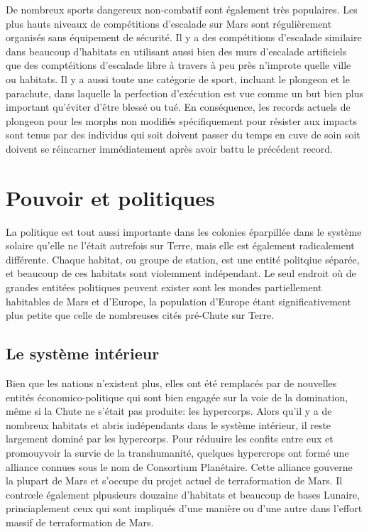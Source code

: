 De nombreux sports dangereux non-combatif sont également très populaires. Les plus hauts niveaux de compétitions d'escalade sur Mars sont régulièrement organisés sans équipement de sécurité. Il y a des compétitions d'escalade similaire dans beaucoup d'habitats en utilisant aussi bien des murs d'escalade artificiels que des comptéitions d'escalade libre à travers à peu près n'improte quelle ville ou habitats. Il y a aussi toute une catégorie de sport, incluant le plongeon et le parachute, dans laquelle la perfection d'exécution est vue comme un but bien plus important qu'éviter d'être blessé ou tué. En conséquence, les records actuels de plongeon pour les morphs non modifiés spécifiquement pour résister aux impacts sont tenus par des individus qui soit doivent passer du temps en cuve de soin soit doivent se réincarner immédiatement après avoir battu le précédent record. 

\section{Pouvoir et politiques} \label{sec:politics-power} 

La politique est tout aussi importante dans les colonies éparpillée dans le système solaire qu'elle ne l'était autrefois sur Terre, mais elle est également radicalement différente. Chaque habitat, ou groupe de station, est une entité politqiue séparée, et beaucoup de ces habitats sont violemment indépendant. Le seul endroit où de grandes entitées politiques peuvent exister sont les mondes partiellement habitables de Mars et d'Europe, la population d'Europe étant significativement plus petite que celle de nombreuses cités pré-Chute sur Terre. 

\subsection{Le système intérieur} \label{sec:inner-system} 

Bien que les nations n'existent plus, elles ont été remplacés par de nouvelles entités économico-politique qui sont bien engagée sur la voie de la domination, même si la Chute ne s'était pas produite: les hypercorps. Alors qu'il y a de nombreux habitats et abris indépendants dans le système intérieur, il reste largement dominé par les hypercorps. Pour réduuire les confits entre  eux et promouyvoir la survie de la transhumanité, quelques hypercrops ont formé une alliance connues sous le nom de Consortium Planétaire. Cette alliance gouverne la plupart de Mars et s'occupe du projet actuel de terraformation de Mars. Il contrœle également plpusieurs douzaine d'habitats et beaucoup de bases Lunaire, princiaplement ceux qui sont impliqués d'une manière ou d'une autre dans l'effort massif de terraformation de Mars. 

